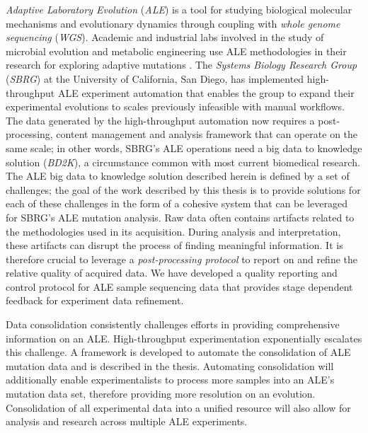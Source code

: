 \documentclass[12pt,final,masters,chapterheads]{ucsd}  %
\begin{document}
%
%
%
%
\textit{Adaptive Laboratory Evolution} (\textit{ALE}) is a tool for studying biological molecular mechanisms and evolutionary dynamics through coupling with \textit{whole genome sequencing} (\textit{WGS}). Academic and industrial labs involved in the study of microbial evolution and metabolic engineering use ALE methodologies in their research for exploring adaptive mutations \cite{ASM:/content/journal/microbe/10.1128/microbe.6.69.1}. The \textit{Systems Biology Research Group} (\textit{SBRG}) at the University of  California, San Diego, has implemented high-throughput ALE experiment automation that enables the group to expand their experimental evolutions to scales previously infeasible with manual workflows. The data generated by the high-throughput automation now requires a post-processing, content management and analysis framework that can operate on the same scale; in other words, SBRG's ALE operations need a big data to knowledge solution (\textit{BD2K}), a circumstance common with most current biomedical research\cite{Margolis957}. The ALE big data to knowledge solution described herein is defined by a set of challenges; the goal of the work described by this thesis is to provide solutions for each of these challenges in the form of a cohesive system that can be leveraged for SBRG's ALE mutation analysis.
%
%
Raw data often contains artifacts related to the methodologies used in its acquisition. During analysis and interpretation, these artifacts can disrupt the process of finding meaningful information. It is therefore crucial to leverage a \textit{post-processing protocol} to report on and refine the relative quality of acquired data. We have developed a quality reporting and control protocol for ALE sample sequencing data that provides stage dependent feedback for experiment data refinement.

Data consolidation consistently challenges efforts in providing comprehensive information on an ALE. High-throughput experimentation exponentially escalates this challenge. A framework is developed  to automate the consolidation of ALE mutation data and is described in the thesis. Automating consolidation will additionally enable experimentalists to process more samples into an ALE's mutation data set, therefore providing more resolution on an evolution. Consolidation of all experimental data into a unified resource will also allow for analysis and research across multiple ALE experiments.
\end{document}
